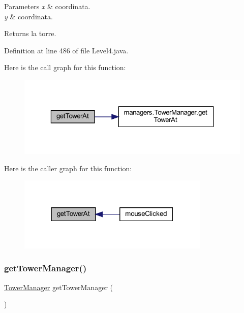 \begin{DoxyParams}{Parameters}
{\em x} & coordinata. \\
\hline
{\em y} & coordinata.\\
\hline
\end{DoxyParams}
\begin{DoxyReturn}{Returns}
la torre. 
\end{DoxyReturn}


Definition at line 486 of file Level4.\+java.

Here is the call graph for this function\+:\nopagebreak
\begin{figure}[H]
\begin{center}
\leavevmode
\includegraphics[width=323pt]{classscenes_1_1_level4_a4345f2e80059788e5ab1dd1cf0ff2c04_cgraph}
\end{center}
\end{figure}
Here is the caller graph for this function\+:\nopagebreak
\begin{figure}[H]
\begin{center}
\leavevmode
\includegraphics[width=259pt]{classscenes_1_1_level4_a4345f2e80059788e5ab1dd1cf0ff2c04_icgraph}
\end{center}
\end{figure}
\mbox{\label{classscenes_1_1_level4_a6fff8a01141127e3c2897a077e5dee92}} 
\subsubsection{\texorpdfstring{get\+Tower\+Manager()}{getTowerManager()}}
{\footnotesize\ttfamily \hyperlink{classmanagers_1_1_tower_manager}{Tower\+Manager} get\+Tower\+Manager (\begin{DoxyParamCaption}{ }\end{DoxyParamCaption})}



